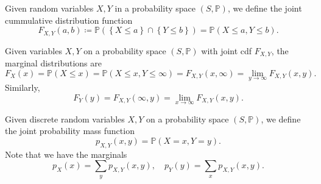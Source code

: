 \begin{definition}
    Given random variables \(X, Y\) in a probability space \((S, \mathbb{P})\), we define the joint cummulative distribution function 
    \[
        F_{X, Y} (a, b) \coloneqq \mathbb{P} \left( \left\{ X \le a \right\} \cap \left\{ Y \le b \right\}   \right) = \mathbb{P} (X \le a, Y \le b). 
    \]  
\end{definition}

\begin{definition}
    Given variables \(X, Y\) on a probability space \((S, \mathbb{P})\) with joint cdf \(F_{X,Y}\), the marginal distributions are 
    \[
        F_X(x) = \mathbb{P} (X \le x) = \mathbb{P} (X \le x, Y \le \infty) = F_{X, Y}(x, \infty) = \lim_{y \to \infty} F_{X, Y} (x, y). 
    \]   
    Similarly, 
    \[
        F_Y(y) = F_{X, Y}(\infty , y) = \lim_{x \to \infty} F_{X, Y} (x, y). 
    \]
\end{definition}

\begin{definition}
    Given discrete random variables \(X, Y\) on a probability space \((S, \mathbb{P})\), we define the joint probability mass function 
    \[
        p_{X, Y} (x, y) = \mathbb{P} (X = x, Y = y).
    \]  
    Note that we have the marginals 
    \[
        p_X(x) = \sum_{y} p_{X, Y} (x, y), \quad p_Y(y) = \sum_{x} p_{X, Y} (x, y).   
    \]
\end{definition}


